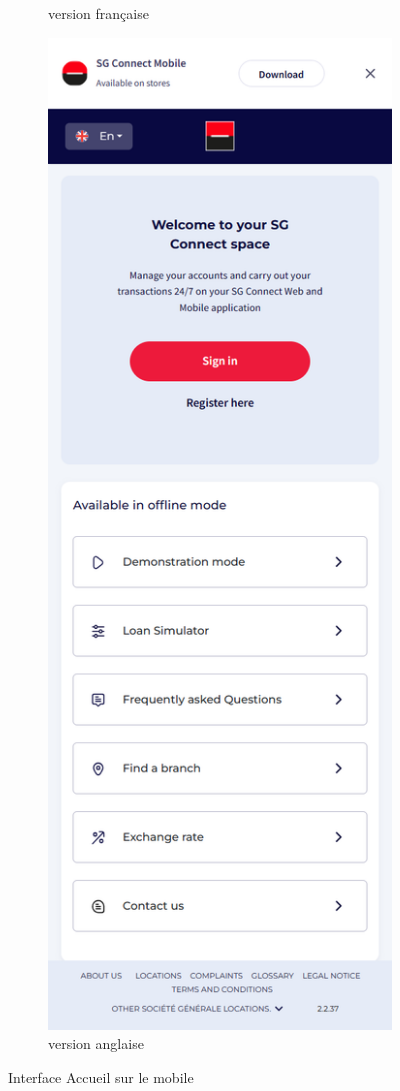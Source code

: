 \begin{figure}[!ht]
\begin{subfigure}[b]{0.49\textwidth}
        \caption{version française}
    \end{subfigure}
    \hfill
    \begin{subfigure}[b]{0.49\textwidth}
        \centering
        \includegraphics[width=\textwidth]{images/screens/home/mob.png}
        \caption{version anglaise}
    \end{subfigure}
       \caption{Interface Accueil sur le mobile}
\end{figure}

